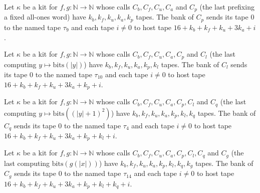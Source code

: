 \begin{definition}
\label{Turing.NTimeDiag.QyKit.bPr}
\leanok
{}
Let $\kappa$ be a kit for $f, g : \mathbb{N} \to \mathbb{N}$ whose calls $C_b, C_f, C_u, C_a$ and
$C_p$ (the last prefixing a fixed all-ones word) have $k_b, k_f, k_u, k_a, k_p$ tapes. The bank of
$C_p$ sends its tape $0$ to the named tape $\tau_9$ and each tape $i \ne 0$ to host tape
$16 + k_b + k_f + k_u + 3k_a + i$.
\end{definition}

\begin{definition}
\label{Turing.NTimeDiag.QyKit.bCl}
\leanok
{}
Let $\kappa$ be a kit for $f, g : \mathbb{N} \to \mathbb{N}$ whose calls $C_b, C_f, C_u, C_a, C_p$
and $C_l$ (the last computing $y \mapsto \mathrm{bits}(|y|)$) have $k_b, k_f, k_u, k_a, k_p, k_l$
tapes. The bank of $C_l$ sends its tape $0$ to the named tape $\tau_{10}$ and each tape $i \ne 0$
to host tape $16 + k_b + k_f + k_u + 3k_a + k_p + i$.
\end{definition}

\begin{definition}
\label{Turing.NTimeDiag.QyKit.bPb}
\leanok
{}
Let $\kappa$ be a kit for $f, g : \mathbb{N} \to \mathbb{N}$ whose calls $C_b, C_f, C_u, C_a, C_p,
C_l$ and $C_q$ (the last computing $y \mapsto \mathrm{bits}((|y|+1)^2)$) have
$k_b, k_f, k_u, k_a, k_p, k_l, k_q$ tapes. The bank of $C_q$ sends its tape $0$ to the named tape
$\tau_4$ and each tape $i \ne 0$ to host tape $16 + k_b + k_f + k_u + 3k_a + k_p + k_l + i$.
\end{definition}

\begin{definition}
\label{Turing.NTimeDiag.QyKit.bCg}
\leanok
{}
Let $\kappa$ be a kit for $f, g : \mathbb{N} \to \mathbb{N}$ whose calls $C_b, C_f, C_u, C_a, C_p,
C_l, C_q$ and $C_g$ (the last computing $\mathrm{bits}(g(|x|))$) have
$k_b, k_f, k_u, k_a, k_p, k_l, k_q, k_g$ tapes. The bank of $C_g$ sends its tape $0$ to the named
tape $\tau_{14}$ and each tape $i \ne 0$ to host tape
$16 + k_b + k_f + k_u + 3k_a + k_p + k_l + k_q + i$.
\end{definition}

